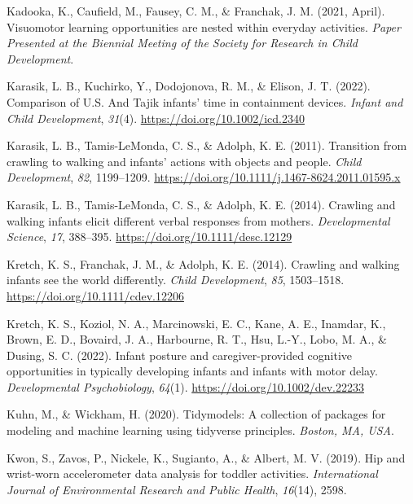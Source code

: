 \documentclass[
  man]{apa6}
\newlength{\cslhangindent}
\newlength{\cslentryspacingunit} %
\newenvironment{CSLReferences}[2] %
 {%
  \setlength{\parindent}{0pt}
  \ifodd #1
  \let\oldpar\par
  \def\par{\hangindent=\cslhangindent\oldpar}
  \fi
  \setlength{\parskip}{#2\cslentryspacingunit}
 }%
 {}
\begin{document}
\begin{CSLReferences}{1}{0}
\leavevmode{}%
Kadooka, K., Caufield, M., Fausey, C. M., \& Franchak, J. M. (2021, April). Visuomotor learning opportunities are nested within everyday activities. \emph{Paper Presented at the Biennial Meeting of the Society for Research in Child Development}.

\leavevmode{}%
Karasik, L. B., Kuchirko, Y., Dodojonova, R. M., \& Elison, J. T. (2022). Comparison of {U.S.} And {Tajik} infants' time in containment devices. \emph{Infant and Child Development}, \emph{31}(4). \url{https://doi.org/10.1002/icd.2340}

\leavevmode{}%
Karasik, L. B., Tamis-LeMonda, C. S., \& Adolph, K. E. (2011). Transition from crawling to walking and infants' actions with objects and people. \emph{Child Development}, \emph{82}, 1199--1209. \url{https://doi.org/10.1111/j.1467-8624.2011.01595.x}

\leavevmode{}%
Karasik, L. B., Tamis-LeMonda, C. S., \& Adolph, K. E. (2014). Crawling and walking infants elicit different verbal responses from mothers. \emph{Developmental Science}, \emph{17}, 388--395. \url{https://doi.org/10.1111/desc.12129}

\leavevmode{}%
Kretch, K. S., Franchak, J. M., \& Adolph, K. E. (2014). Crawling and walking infants see the world differently. \emph{Child Development}, \emph{85}, 1503--1518. \url{https://doi.org/10.1111/cdev.12206}

\leavevmode{}%
Kretch, K. S., Koziol, N. A., Marcinowski, E. C., Kane, A. E., Inamdar, K., Brown, E. D., Bovaird, J. A., Harbourne, R. T., Hsu, L.-Y., Lobo, M. A., \& Dusing, S. C. (2022). Infant posture and caregiver-provided cognitive opportunities in typically developing infants and infants with motor delay. \emph{Developmental Psychobiology}, \emph{64}(1). \url{https://doi.org/10.1002/dev.22233}

\leavevmode{}%
Kuhn, M., \& Wickham, H. (2020). Tidymodels: A collection of packages for modeling and machine learning using tidyverse principles. \emph{Boston, MA, USA}.

\leavevmode{}%
Kwon, S., Zavos, P., Nickele, K., Sugianto, A., \& Albert, M. V. (2019). Hip and wrist-worn accelerometer data analysis for toddler activities. \emph{International Journal of Environmental Research and Public Health}, \emph{16}(14), 2598.


\end{CSLReferences}
\end{document}
